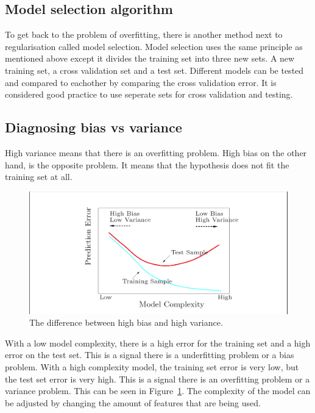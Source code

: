 \subsection{Model selection algorithm}
To get back to the problem of overfitting, there is another method next to regularisation called model selection. Model selection uses the same principle as mentioned above except it divides the training set into three new sets. A new training set, a cross validation set and a test set. Different models can be tested and compared to eachother by comparing the cross validation error. It is considered good practice to use seperate sets for cross validation and testing.

\subsection{Diagnosing bias vs variance}
High variance means that there is an overfitting problem. High bias on the other hand, is the opposite problem. It means that the hypothesis does not fit the training set at all.
\begin{figure}[H]
\centering
\includegraphics[width=\textwidth]{Figures/biasvariance}
\decoRule
\caption[High bias vs high variance]{The difference between high bias and high variance.}
\label{fig:biasvariance}
\end{figure}
\noindent With a low model complexity, there is a high error for the training set and a high error on the test set. This is a signal there is a underfitting problem or a bias problem. With a high complexity model, the training set error is very low, but the test set error is very high. This is a signal there is an overfitting problem or a variance problem. This can be seen in Figure~\ref{fig:biasvariance}. The complexity of the model can be adjusted by changing the amount of features that are being used. 


